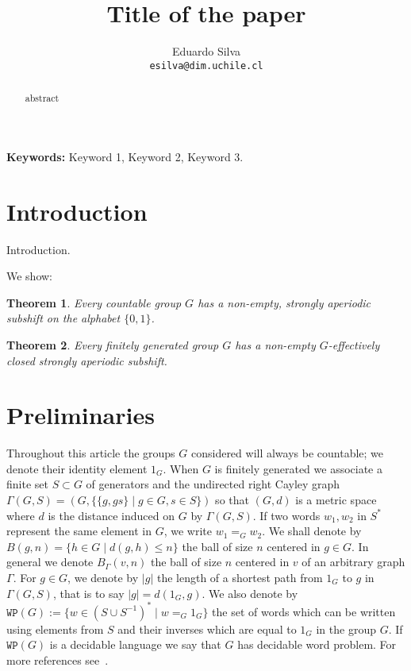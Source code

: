 \documentclass[letterpaper]{amsart}
\title{Title of the paper}
\date{}
\author{Eduardo Silva \\
	\texttt{esilva@dim.uchile.cl}}
\theoremstyle{plain}
\newtheorem{theorem}{Theorem}[section]
\newcommand{\cor}[2][]{#2}
\begin{document}
	
	\maketitle 
	
	\begin{abstract}
	abstract
	\end{abstract}	
	
	\textbf{Keywords:} Keyword 1, Keyword 2, Keyword 3.
	
	\section*{Introduction}
	\label{section.introduction}
	
	Introduction.
	
	We show:
	
	{
		\renewcommand{\thetheorem}{\ref{theorem.free_subflow}}
		\begin{theorem}
			Every countable group $G$ has a non-empty, strongly aperiodic subshift on the alphabet $\{0,1\}$.
		\end{theorem}
		\addtocounter{theorem}{-1}
	}
	
	
	{
		\renewcommand{\thetheorem}{\ref{theorem.strongly_aperiodic1}}
		\begin{theorem}
			Every finitely generated group $G$ has a non-empty $G$-effectively closed strongly aperiodic subshift.
		\end{theorem}
		\addtocounter{theorem}{-1}
	}	
	
	
	\section{Preliminaries}
	\label{section.preliminaries}
	
	Throughout this article the groups $G$ considered will \cor[be either countable or finitely generated]{always be countable}; we denote their identity element $1_G$. When $G$ is finitely generated we associate a finite set $S\subset G$ of generators and the undirected right Cayley graph $\Gamma(G,S) = (G, \{ \{g,gs\} \mid g \in G, s\in S\})$ so that $(G,d)$ is a metric space where $d$ is the distance induced on $G$ by $\Gamma(G,S)$. \cor{If two words $w_1,w_2$ in $S^*$ represent the same element in $G$, we write $w_1 =_G w_2$.} We shall denote by $B(g,n) = \{h \in G \mid d(g,h) \leq n\}$ the ball of size $n$ centered in $g \in G$. In general we denote $B_{\Gamma}(v,n)$ the ball of size $n$ centered in $v$ of an arbitrary graph $\Gamma$. \cor{For $g\in G$, we denote by $|g|$ the length of a shortest path from $1_G$ to $g$ in $\Gamma(G,S)$, that is to say $|g|=d(1_G,g)$.} We also denote by $\texttt{WP}(G) := \{ w \in (S\cup S^{-1})^{*} \mid w =_G 1_G \}$ the set of words which can be written using elements 
	from $S$ and their inverses which are equal to $1_G$ in the group $G$. If $\texttt{WP}(G)$ is a decidable language we say that $G$ has decidable word problem. For more references see~\cite{MagnusKarassSolitar2004}.
	
\end{document}
